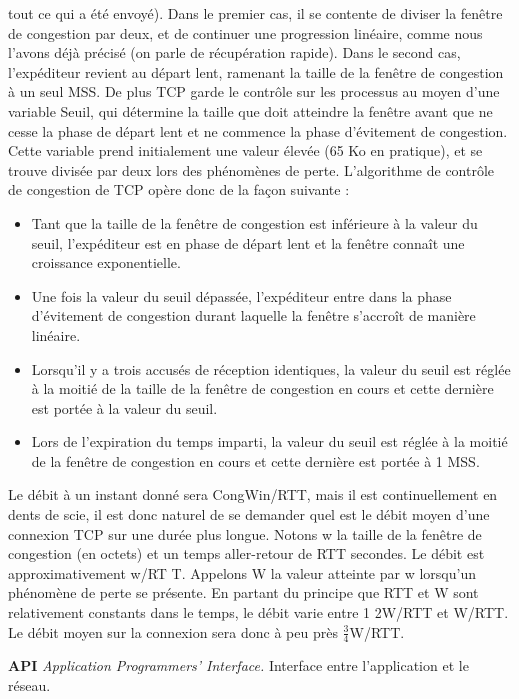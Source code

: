 tout ce qui a été envoyé). Dans le premier cas, il se contente de diviser la fenêtre de
congestion par deux, et de continuer une progression linéaire, comme nous l’avons déjà
précisé (on parle de récupération rapide). Dans le second cas, l’expéditeur revient au
départ lent, ramenant la taille de la fenêtre de congestion à un seul MSS. De plus TCP
garde le contrôle sur les processus au moyen d’une variable Seuil, qui détermine la taille
que doit atteindre la fenêtre avant que ne cesse la phase de départ lent et ne commence
la phase d’évitement de congestion. Cette variable prend initialement une valeur élevée
(65 Ko en pratique), et se trouve divisée par deux lors des phénomènes de perte.
L’algorithme de contrôle de congestion de TCP opère donc de la façon suivante :
\begin{itemize}
	\item Tant que la taille de la fenêtre de congestion est inférieure à la valeur du seuil,
l’expéditeur est en phase de départ lent et la fenêtre connaît une croissance exponentielle.
	\item Une fois la valeur du seuil dépassée, l’expéditeur entre dans la phase d’évitement
de congestion durant laquelle la fenêtre s’accroît de manière linéaire.
	\item Lorsqu’il y a trois accusés de réception identiques, la valeur du seuil est réglée à la
moitié de la taille de la fenêtre de congestion en cours et cette dernière est portée
à la valeur du seuil.
	\item Lors de l’expiration du temps imparti, la valeur du seuil est réglée à la moitié de
la fenêtre de congestion en cours et cette dernière est portée à 1 MSS.
\end{itemize}
Le débit à un instant donné sera CongWin/RTT, mais il est continuellement en dents
de scie, il est donc naturel de se demander quel est le débit moyen d’une connexion TCP
sur une durée plus longue. Notons w la taille de la fenêtre de congestion (en octets) et un
temps aller-retour de RTT secondes. Le débit est approximativement w/RT T. Appelons
W la valeur atteinte par w lorsqu’un phénomène de perte se présente. En partant du
principe que RTT et W sont relativement constants dans le temps, le débit varie entre
1
2W/RTT et W/RTT. Le débit moyen sur la connexion sera donc à peu près $\frac{3}{4}$W/RTT.




\textbf{API} \textit{Application Programmers' Interface.} Interface entre l'application et le réseau.



